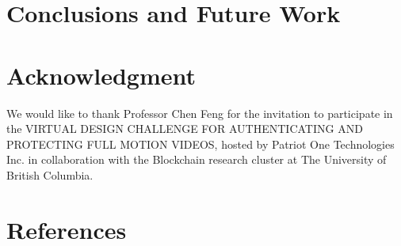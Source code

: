 \documentclass[conference]{IEEEtran}
\begin{document}
\section{Conclusions and Future Work}
\section*{Acknowledgment}
We would like to thank Professor Chen Feng for the invitation to participate in the VIRTUAL DESIGN CHALLENGE FOR AUTHENTICATING  AND  PROTECTING  FULL  MOTION  VIDEOS, hosted by Patriot One Technologies Inc. in collaboration with the Blockchain research cluster at The University of British Columbia.
\section*{References}
\end{document}
